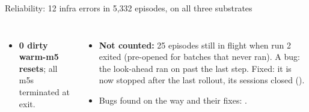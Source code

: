 \begin{frame}{Reliability: 12 infra errors in 5,332 episodes, on all three substrates}
\begin{columns}[T]
\begin{itemize}
\item \textbf{0 dirty warm-m5 resets}; all m5s terminated at exit.
\end{itemize}
\begin{itemize}\scriptsize\setlength{\itemsep}{0.8mm}
\item \textbf{Not counted:} 25 episodes still in flight when run 2 exited (pre-opened for batches that never ran). A bug: the look-ahead ran on past the last step. Fixed: it is now stopped after the last rollout, its sessions closed ().
\item Bugs found on the way and their fixes: .
\end{itemize}
\end{columns}
\end{frame}

